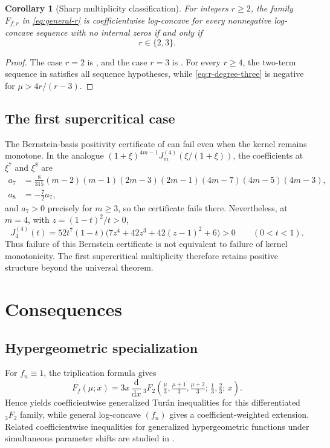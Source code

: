 \documentclass[11pt,a4paper]{amsart}
\numberwithin{equation}{section}
\theoremstyle{plain}
\newtheorem{corollary}[theorem]{Corollary}
\theoremstyle{definition}
\begin{document}
\begin{corollary}[Sharp multiplicity classification]\label{cor:multiplicity}
For integers \(r\ge2\), the family \(F_{f,r}\) in \eqref{eq:general-r} is
coefficientwise log-concave for every nonnegative log-concave sequence with no
internal zeros if and only if
\[
 r\in\{2,3\}.
\]
\end{corollary}

\begin{proof}
The case \(r=2\) is \cite[Thm.~2]{KarpZhang2024LogConcavity}, and the case
\(r=3\) is .  For every \(r\ge4\), the two-term sequence in
 satisfies all sequence hypotheses, while
\eqref{eq:r-degree-three} is negative for
\(\mu>4r/(r-3)\).
\end{proof}

\subsection{The first supercritical case}\label{subsec:first-supercritical-case}
The Bernstein-basis positivity certificate of  can fail
even when the kernel remains monotone.  In the analogue
\((1+\xi)^{4m-1}J^{(4)}_m(\xi/(1+\xi))\), the coefficients at \(\xi^7\) and
\(\xi^8\) are
\begin{align*}
 a_7&=\tfrac{8}{315}(m-2)(m-1)(2m-3)(2m-1)(4m-7)(4m-5)(4m-3),\\
 a_8&=-\tfrac72a_7,
\end{align*}
and \(a_7>0\) precisely for \(m\ge3\), so the certificate fails there.
Nevertheless, at \(m=4\), with
\(z=(1-t)^2/t>0\),
\[
 J^{(4)}_4(t)
 =52t^7(1-t)\bigl(7z^4+42z^3+42(z-1)^2+6\bigr)>0
 \qquad(0<t<1).
\]
Thus failure of this Bernstein certificate is not equivalent to failure of kernel
monotonicity.  The first supercritical multiplicity therefore retains positive
structure beyond the universal theorem.



\section{Consequences}\label{sec:consequences}

\subsection{Hypergeometric specialization}\label{subsec:hypergeometric-specialization}

For \(f_n\equiv1\), the triplication formula gives
\[
 F_f(\mu;x)
 =3x\,\frac{\mathrm d}{\mathrm dx}\,
 {}_3F_2\!\left(\tfrac{\mu}{3},\tfrac{\mu+1}{3},\tfrac{\mu+2}{3};\,
 \tfrac13,\tfrac23;\,x\right).
\]
Hence  yields coefficientwise generalized Tur\'an inequalities for
this differentiated \({}_3F_2\) family, while general log-concave \((f_n)\) gives a
coefficient-weighted extension.  Related coefficientwise inequalities for generalized
hypergeometric functions under simultaneous parameter shifts are studied in
\cite[Thm.~3]{KalmykovKarp2017LogConcavity}.
\end{document}
